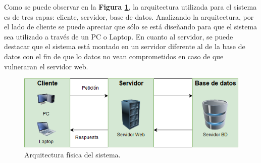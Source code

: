 Como se puede observar en la \textbf{Figura \ref{fig: Arquitectura_Fisica}}, la arquitectura utilizada para el sistema es de tres capas: cliente, servidor, base de datos. Analizando la arquitectura, por el lado de cliente se puede apreciar que sólo se está diseñando para que el sistema sea utilizado a través de un PC o Laptop. En cuanto al servidor, se puede destacar que el sistema está montado en un servidor diferente al de la base de datos con el fin de que lo datos no vean comprometidos en caso de que vulneraran el servidor web.

\begin{figure}[htb]
    \includegraphics[width=\textwidth]{Imagenes/Arquitectura_Fisica.png}
    \caption{\label{fig: Arquitectura_Fisica}Arquitectura física del sistema.}
\end{figure}